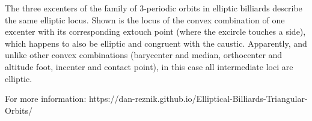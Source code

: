 The three excenters of the family of 3-periodic orbits in elliptic billiards describe the same elliptic locus. Shown is the locus of the convex combination of one excenter with its corresponding extouch point (where the excircle touches a side), which happens to also be elliptic and congruent with the caustic.  Apparently, and unlike other convex combinations (barycenter and median, orthocenter and altitude foot, incenter and contact point), in this case all intermediate loci are elliptic.

For more information: https://dan-reznik.github.io/Elliptical-Billiards-Triangular-Orbits/